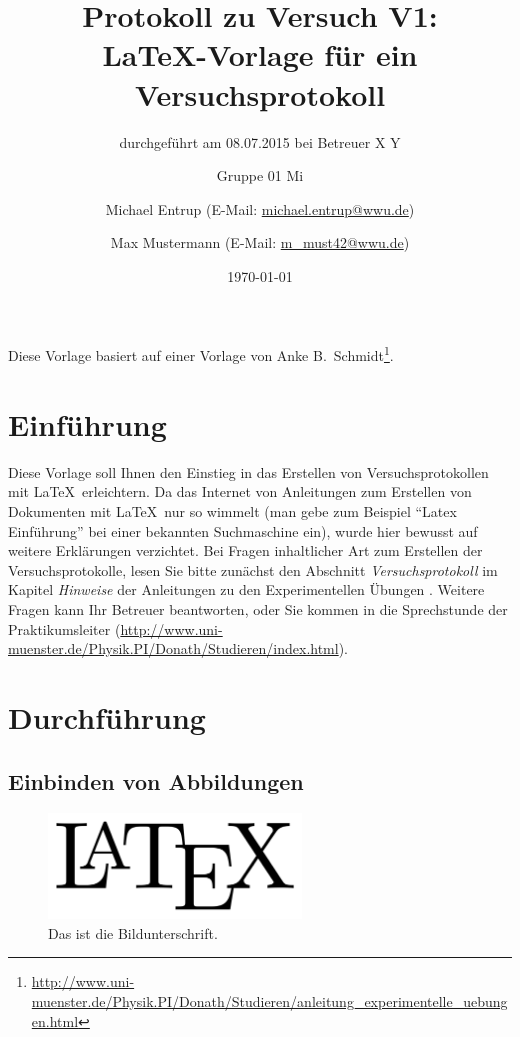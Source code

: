 \documentclass[
	fontsize=11pt,
	paper=a4,
	pagesize=auto,
	parskip=false,
	titlepage=on,
	ngerman
]{scrartcl}
\title{Protokoll zu Versuch V1:\\\LaTeX-Vorlage für ein Versuchsprotokoll}
\subtitle{durchgeführt am 08.07.2015 bei Betreuer X Y}
\author{
	Gruppe 01 Mi\and
	Michael Entrup (E-Mail: \url{michael.entrup@wwu.de}) \and
	Max Mustermann (E-Mail: \url{m_must42@wwu.de})
}
\date{\today}
\begin{document}
\maketitle

\newpage

\tableofcontents

\newpage

Diese Vorlage basiert auf einer Vorlage von Anke B.\ Schmidt\footnote{\url{http://www.uni-muenster.de/Physik.PI/Donath/Studieren/anleitung_experimentelle_uebungen.html}}.

\section{Einführung}

Diese Vorlage soll Ihnen den Einstieg in das Erstellen von Versuchsprotokollen mit \LaTeX\ erleichtern. Da das Internet von Anleitungen zum Erstellen von Dokumenten mit \LaTeX\ nur so wimmelt (man gebe zum Beispiel ``Latex Einführung'' bei einer bekannten Suchmaschine ein), wurde hier bewusst auf weitere Erklärungen verzichtet. Bei Fragen inhaltlicher Art zum Erstellen der Versuchsprotokolle, lesen Sie bitte zunächst den Abschnitt \emph{Versuchsprotokoll} im Kapitel \emph{Hinweise} der Anleitungen zu den Experimentellen Übungen \cite{anleitung}. Weitere Fragen kann Ihr Betreuer beantworten, oder Sie kommen in die Sprechstunde der Praktikumsleiter (\url{http://www.uni-muenster.de/Physik.PI/Donath/Studieren/index.html}).

\section{Durchführung}

\subsection{Einbinden von Abbildungen}

\begin{figure}[htb]
	\centering
	\includegraphics[width=0.6\textwidth]{Bild}
	\caption{Das ist die Bildunterschrift.}\label{Bild}
\end{figure}
\end{document}
